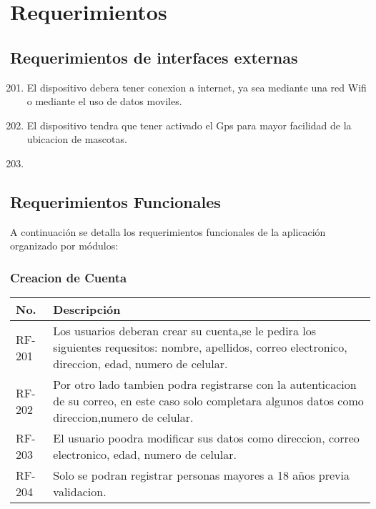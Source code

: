 \chapter{Requerimientos}

\section{Requerimientos de interfaces externas}
\begin{flushright}
	
	\begin{enumerate} [label=RF-\arabic*. , align=left]
		\setcounter{enumi}{200}	 %
		\item El dispositivo debera tener conexion a internet, ya sea mediante una red Wifi o mediante el uso de datos moviles.
		
		\item El dispositivo tendra que tener activado el Gps para mayor facilidad de la ubicacion de mascotas.
		\item 
		
		
	\end{enumerate}
	
\end{flushright}


\section{Requerimientos Funcionales}

A continuación se detalla los requerimientos funcionales de la aplicación organizado por módulos:

\subsection{Creacion de Cuenta}
\begin{table}[h!]	
	\begin{tabular}{ |p{2cm}|p{12cm}| }	\hline
		
		\rowcolor{gray!50}  \textbf{No.}  &  \textbf{Descripción} \\ \hline
		
		RF-201&Los usuarios deberan crear su cuenta,se le pedira los siguientes requesitos: nombre, apellidos, correo electronico, direccion, edad, numero de celular.  \\	\hline
		
		RF-202& Por otro lado tambien podra registrarse con la autenticacion de su correo, en este caso solo completara algunos datos como direccion,numero de celular. \\ \hline
		
		RF-203&El usuario poodra modificar sus datos como direccion, correo electronico, edad, numero de celular.\\ \hline
		
		RF-204& Solo se podran registrar personas mayores a 18 años previa validacion.  \\ \hline
		
		
	\end{tabular}
\end{table}	





